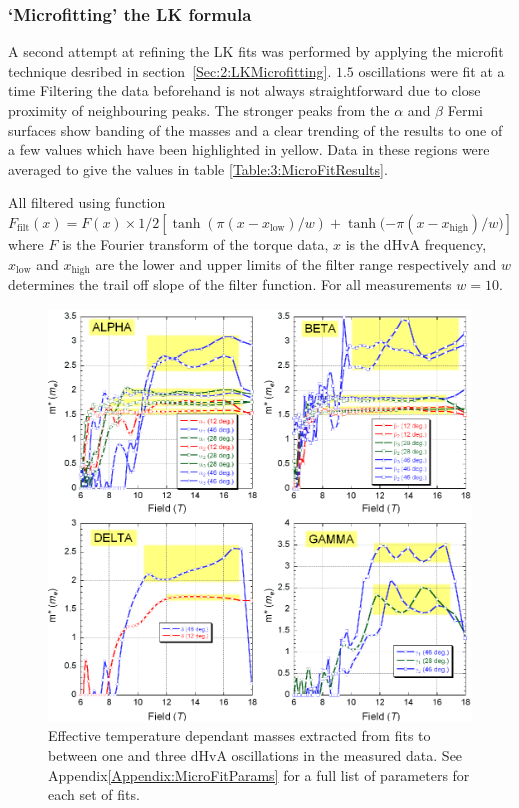 \subsubsection{`Microfitting' the LK formula}

A second attempt at refining the LK fits was performed by applying the microfit technique desribed in section~\ref{Sec:2:LKMicrofitting}. $1.5$ oscillations were fit at a time Filtering the data beforehand is not always straightforward due to close proximity of neighbouring peaks. The stronger peaks from the $\alpha$ and $\beta$ Fermi surfaces show banding of the masses and a clear trending of the results to one of a few values which have been highlighted in yellow. Data in these regions were averaged to give the values in table \ref{Table:3:MicroFitResults}.

All filtered using function $\textit{F}_{\textrm{filt}}(x) = \textit{F}(x) \times 1/2 [\tanh{(\pi(x - x_{\textrm{low}})/w)} + \tanh{(-\pi(x - x_{\textrm{high}})/w})]$ where $\textit{F}$ is the Fourier transform of the torque data, $x$ is the dHvA frequency, $x_{\textrm{low}}$ and $x_{\textrm{high}}$ are the lower and upper limits of the filter range respectively and $w$ determines the trail off slope of the filter function. For all measurements $w=10$.
\begin{figure}[htbp]
    \begin{center}
        \includegraphics[scale=0.7]{Chapter3-dHvABaFe2P2/Figures/Mass/MicroFits/MicroFits}
        \caption{Effective temperature dependant masses extracted from fits to between one and three dHvA oscillations in the measured data. See Appendix\ref{Appendix:MicroFitParams} for a full list of parameters for each set of fits.}
        \label{Fig:3:MicroFits}
    \end{center}
\end{figure}
